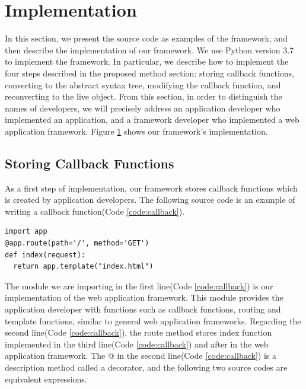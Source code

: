 \documentclass[conference]{IEEEtran}
\begin{document}
\section{Implementation}
In this section, we present the source code as examples of the framework, and then describe the implementation of our framework. We use Python version 3.7 to implement the framework.
In particular, we describe how to implement the four steps described in the proposed method section: storing callback functions, converting to the abstract syntax tree, modifying the callback function, and reconverting to the live object.
From this section, in order to distinguish the names of developers, we will precisely address an application developer who implemented an application, and a framework developer who implemented a web application framework.
Figure \ref{fig:implementation_schematic} shows our framework's implementation.
\begin{figure}[htbp]
\label{fig:implementation_schematic}
\end{figure}

\subsection{Storing Callback Functions}
As a first step of implementation, our framework stores callback functions which is created by application developers.
The following source code is an example of writing a callback function(Code \ref{code:callback}).

\begin{lstlisting}[caption={An example of a callback function.}, label=code:callback, captionpos=b]
import app
@app.route(path='/', method='GET')
def index(request):
  return app.template("index.html")
\end{lstlisting}
The module we are importing in the first line(Code \ref{code:callback}) is our implementation of the web application framework.
This module provides the application developer with functions such as callback functions, routing and template functions, similar to general web application frameworks.
Regarding the second line(Code \ref{code:callback}), the route method stores index function implemented in the third line(Code \ref{code:callback}) and after in the web application framework.
The @ in the second line(Code \ref{code:callback}) is a description method called a decorator, and the following two source codes are equivalent expressions.
\end{document}
